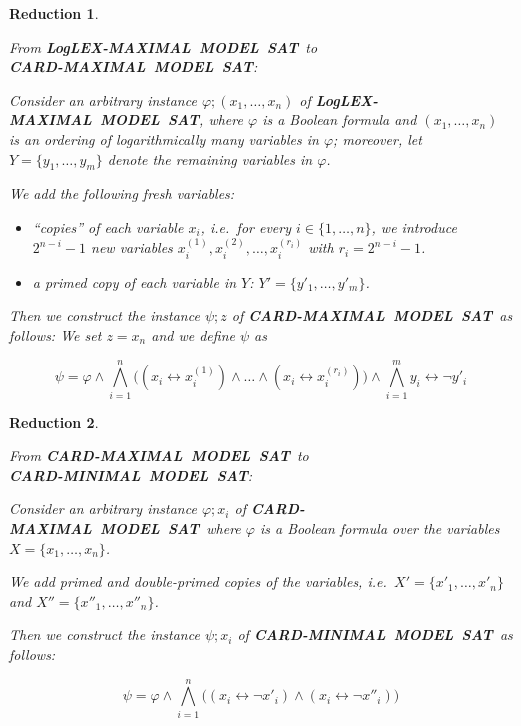 \documentclass [11pt]{article}
\newtheorem{reduction}{Reduction}
\renewcommand{\phi}{\varphi}
\newcommand{\MINCARDSAT}{\mbox{\bf CARD-MINIMAL MODEL SAT}}
\newcommand{\MAXCARDSAT}{\mbox{\bf CARD-MAXIMAL MODEL SAT}}
\newcommand{\LogMAXLEXSAT}{\mbox{\bf LogLEX-MAXIMAL MODEL SAT}}
\begin{document}
\begin{reduction}
\label{red:2}
{\em 
From \LogMAXLEXSAT\ to 
\\
\MAXCARDSAT: 

\smallskip

\noindent
Consider an arbitrary instance 
$\phi; (x_1, \dots, x_n)$ of 
\LogMAXLEXSAT, \linebreak
where
$\phi$ is a Boolean formula 
and 
$(x_1, \dots, x_n)$ is an ordering 
of logarithmically many variables in $\phi$;
moreover, let $Y = \{y_1, \dots, y_m\}$ denote the remaining variables in $\phi$.

\smallskip

\noindent
We add the following fresh variables: 

\begin{itemize}
\item ``copies'' of each variable $x_i$, i.e.\, for every $i \in \{1, \dots, n\}$,  we introduce $2^{n-i}-1$ new variables 
$x_i^{(1)}, x_i^{(2)},  \dots, x_i^{(r_i)}$ with $r_i = 2^{n-i}-1$. 
%
\item a primed copy of each variable in $Y$: 
$Y' = \{y'_1, \dots, y'_m\}$. 
\end{itemize}

\noindent
Then we construct 
the instance $\psi; z$ of \MAXCARDSAT\ as follows:
We set $z = x_n$ and we define $\psi$ as

\[
\psi  =  \phi  \wedge   
%
\bigwedge_{i=1}^n 
\big( (x_i \leftrightarrow x_i^{(1)}) \wedge \dots
\wedge (x_i \leftrightarrow x_i^{(r_i)})
\big) \wedge  
%
\bigwedge_{i=1}^m 
y_i  \leftrightarrow \neg y'_i 
\]

}
\end{reduction}




\begin{reduction}
\label{red:3}
{\em 
From \MAXCARDSAT\ to 
\\
\MINCARDSAT: 

\smallskip

\noindent
Consider an arbitrary instance 
$\phi; x_i$ of \MAXCARDSAT\
where  $\phi$ is a Boolean formula
over the variables $X = \{x_1, \dots, x_n\}$.


\smallskip

\noindent
We add 
primed and double-primed copies of the variables, i.e.\, 
$X'= \{x'_1, \dots, x'_n\}$ and $X''= \{x''_1, \dots, x''_n\}$. 

\smallskip

\noindent
Then we construct 
the instance 
$\psi;  x_i$
 of \MINCARDSAT\ as follows:

\[
\psi  =   \phi \wedge 
\bigwedge_{i=1}^n 
\big( ( x_i  \leftrightarrow \neg x'_i) 
\wedge
( x_i  \leftrightarrow \neg x''_i)
\big)
\]


}
\end{reduction}
\end{document}

